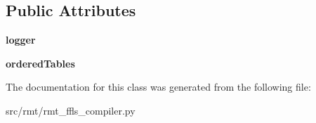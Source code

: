 \subsection*{Public Attributes}
\begin{DoxyCompactItemize}
\item 
\hypertarget{classmapper_1_1src_1_1rmt_1_1rmt__ffls__compiler_1_1_rmt_ffls_compiler_aa476dbdb3befc113eb21a56ba610f574}{}{\bfseries logger}\label{classmapper_1_1src_1_1rmt_1_1rmt__ffls__compiler_1_1_rmt_ffls_compiler_aa476dbdb3befc113eb21a56ba610f574}

\item 
\hypertarget{classmapper_1_1src_1_1rmt_1_1rmt__ffls__compiler_1_1_rmt_ffls_compiler_a222827abed9da46969d45d4a9cd76e04}{}{\bfseries ordered\+Tables}\label{classmapper_1_1src_1_1rmt_1_1rmt__ffls__compiler_1_1_rmt_ffls_compiler_a222827abed9da46969d45d4a9cd76e04}

\end{DoxyCompactItemize}


The documentation for this class was generated from the following file\+:\begin{DoxyCompactItemize}
\item 
src/rmt/rmt\+\_\+ffls\+\_\+compiler.\+py\end{DoxyCompactItemize}
